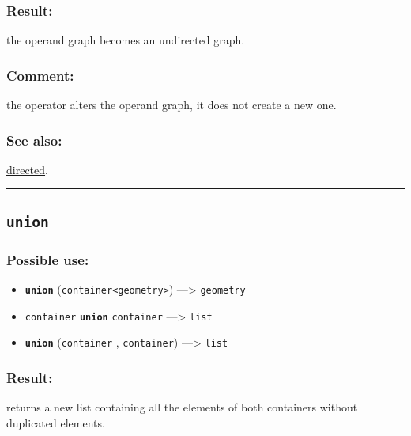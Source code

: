 \documentclass[]{book}
\providecommand{\tightlist}{%
  \setlength{\itemsep}{0pt}\setlength{\parskip}{0pt}}
\theoremstyle{definition}
\theoremstyle{definition}
\theoremstyle{definition}
\theoremstyle{remark}
\begin{document}
\subsubsection{Result:}\label{result-518}

the operand graph becomes an undirected graph.

\subsubsection{Comment:}\label{comment-102}

the operator alters the operand graph, it does not create a new one.

\subsubsection{See also:}\label{see-also-213}

\href{OperatorsDH\#directed}{directed},

\begin{center}\rule{0.5\linewidth}{\linethickness}\end{center}

\subsection{\texorpdfstring{\texttt{union}}{union}}\label{union}

\subsubsection{Possible use:}\label{possible-use-538}

\begin{itemize}
\tightlist
\item
  \textbf{\texttt{union}}
  (\texttt{container\textless{}geometry\textgreater{}})
  ---\textgreater{} \texttt{geometry}
\item
  \texttt{container} \textbf{\texttt{union}} \texttt{container}
  ---\textgreater{} \texttt{list}
\item
  \textbf{\texttt{union}} (\texttt{container} , \texttt{container})
  ---\textgreater{} \texttt{list}
\end{itemize}

\subsubsection{Result:}\label{result-519}

returns a new list containing all the elements of both containers
without duplicated elements.
\end{document}
